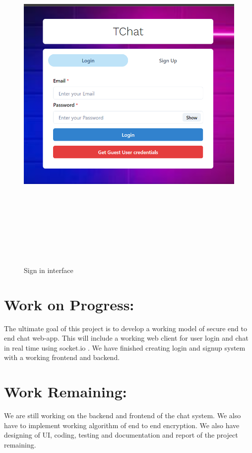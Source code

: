 \begin{figure}[H]
	\centering
	\includegraphics[width=160mm, height=180mm]{images/signin.png}
	\caption{Sign in interface} %
	\label{figusecase} %
\end{figure}


\section{Work on Progress:}
The ultimate goal of this project is to develop a working model of secure end to end chat web-app. This will include a working web client for user login and chat in real time using socket.io . We have finished creating login and signup system with a working frontend and backend.

\section {Work Remaining:}
We are still working on the backend and frontend  of the chat system. We also have to implement working algorithm of end to end encryption. We also have designing of UI, coding, testing and documentation and report of the project remaining.


